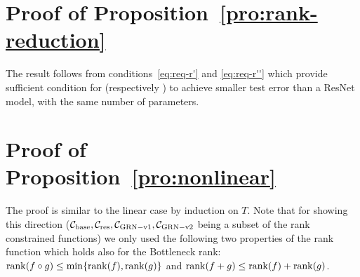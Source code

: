 \section{Proof of Proposition~\ref{pro:rank-reduction}}
The result follows from conditions~\eqref{eq:req-r'} and \eqref{eq:req-r''} which provide sufficient condition for \GenA{} (respectively \GenB{}) to achieve smaller test error than a ResNet model, with the same number of parameters.
\section{Proof of Proposition~\ref{pro:nonlinear}}
The proof is similar to the linear case by induction on $T$. Note that for showing this direction ($\mathcal{C}_{{\rm base}},\mathcal{C}_{{\rm res}},\mathcal{C}_{{\rm GRN-v1{}}}, \mathcal{C}_{{\rm GRN-v2{}}}$ being a subset of the rank constrained functions) we only used the following two properties of the rank function which holds also for the Bottleneck rank: $\operatorname{rank}(f\circ g)\le \min\{\operatorname{rank}(f), \operatorname{rank}(g)\}$ and 
     $\operatorname{rank}(f+g)\le \operatorname{rank}(f)+\operatorname{rank}(g)$.